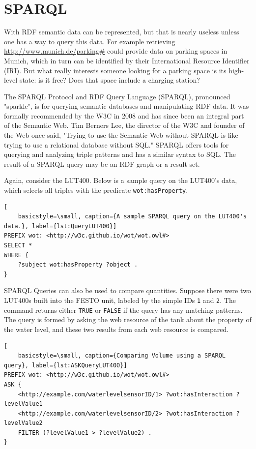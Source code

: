 \cite{Beckett.23.01.2018}

\section{SPARQL}
With RDF semantic data can be represented, but that is nearly useless unless one has a way to query this data.  For example retrieving \url{http://www.munich.de/parking#} could provide data on parking spaces in Munich, which in turn can be identified by their International Resource Identifier (IRI). \cite{Cyganiak.2014} But what really interests someone looking for a parking space is its high-level state: is it free? Does that space include a charging station?


The SPARQL  Protocol and RDF Query Language (SPARQL), pronounced "sparkle", is for querying semantic databases and manipulating RDF data. It was formally recommended by the W3C in 2008  \cite{Herman.2008} and has since been an integral part of the Semantic Web. Tim Berners Lee, the director of the W3C and founder of the Web once said, "Trying to use the Semantic Web without SPARQL is like trying to use a relational database without SQL." \cite{Herman.2008} SPARQL offers tools for querying and analyzing triple patterns and has a similar syntax to SQL. The result of a SPARQL query may be an RDF graph or a result set.

Again, consider the LUT400. Below is a sample query on the LUT400's data, which selects all triples with the predicate \texttt{wot:hasProperty}.

\begin{lstlisting}[
    basicstyle=\small, caption={A sample SPARQL query on the LUT400's data.}, label={lst:QueryLUT400}]
PREFIX wot: <http://w3c.github.io/wot/wot.owl#>
SELECT *
WHERE {
    ?subject wot:hasProperty ?object .
}
\end{lstlisting}

SPARQL Queries can also be used to compare quantities. Suppose there were two LUT400s built into the FESTO unit, labeled by the simple IDs \texttt{1} and \texttt{2}. The  command returns either \texttt{TRUE} or \texttt{FALSE} if the query has any matching patterns. The query is formed by asking the web resource of the tank about the property of the water level, and these two results from each web resource is compared. \cite{.02Oct17}

\begin{lstlisting}[
    basicstyle=\small, caption={Comparing Volume using a SPARQL query}, label={lst:ASKQueryLUT400}]
PREFIX wot: <http://w3c.github.io/wot/wot.owl#>
ASK {
    <http://example.com/waterlevelsensorID/1> ?wot:hasInteraction ?levelValue1
    <http://example.com/waterlevelsensorID/2> ?wot:hasInteraction ?levelValue2
    FILTER (?levelValue1 > ?levelValue2) .
}

\end{lstlisting}
